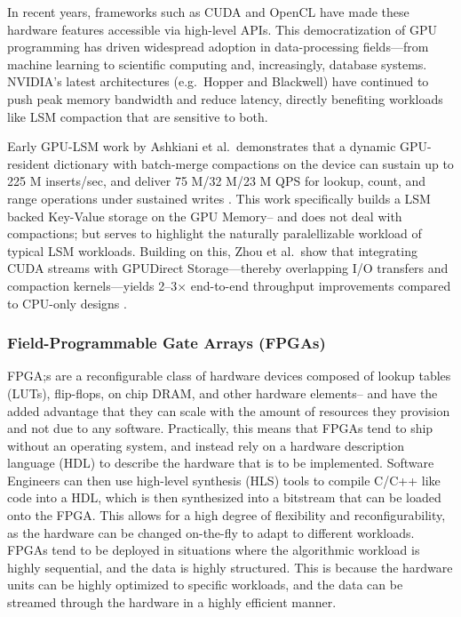 \documentclass[sigconf]{acmart}
\begin{document}
  In recent years, frameworks such as CUDA and OpenCL have made these hardware features accessible via high-level APIs.  
  This democratization of GPU programming has driven widespread adoption in data-processing fields—from machine learning to scientific computing and, increasingly, database systems.  
  NVIDIA’s latest architectures (e.g.\ Hopper and Blackwell) have continued to push peak memory bandwidth and reduce latency, directly benefiting workloads like LSM compaction that are sensitive to both.

  Early GPU-LSM work by Ashkiani et al.\ demonstrates that a dynamic GPU-resident dictionary with batch-merge compactions on the device can sustain up to 225 M inserts/sec, and deliver 75 M/32 M/23 M QPS for lookup, count, and range operations under sustained writes \cite{ashkiani2018gpu}.  This work specifically builds a LSM backed Key-Value storage on the GPU Memory-- and does not deal with compactions; but serves to highlight the naturally paralellizable workload of typical LSM workloads.
  Building on this, Zhou et al.\ show that integrating CUDA streams with GPUDirect Storage—thereby overlapping I/O transfers and compaction kernels—yields 2–3× end-to-end throughput improvements compared to CPU-only designs \cite{zhou2024gpuaccel}.

  \subsubsection{Field-Programmable Gate Arrays (FPGAs)}
  FPGA;s are a reconfigurable class of hardware devices composed of lookup tables (LUTs), flip-flops, on chip DRAM, and other hardware elements-- and have the added advantage that they can scale with the amount of resources they provision and not due to any software.
  Practically, this means that FPGAs tend to ship without an operating system, and instead rely on a hardware description language (HDL) to describe the hardware that is to be implemented. Software Engineers can then use high-level synthesis (HLS) tools to compile C/C++ like code into a HDL, which is then synthesized into a bitstream that can be loaded onto the FPGA. This allows for a high degree of flexibility and reconfigurability, as the hardware can be changed on-the-fly to adapt to different workloads.
  FPGAs tend to be deployed in situations where the algorithmic workload is highly sequential, and the data is highly structured. This is because the hardware units can be highly optimized to specific workloads, and the data can be streamed through the hardware in a highly efficient manner. 
\end{document}
